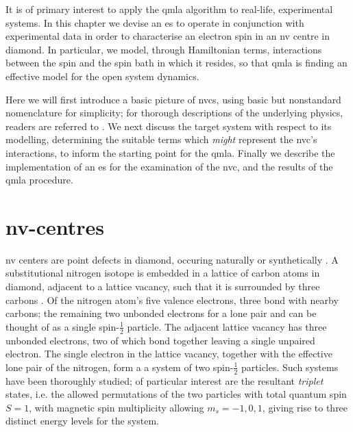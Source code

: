 It is of primary interest to apply the \gls{qmla} algorithm to real-life, experimental systems. 
In this chapter we devise an \gls{es} to operate in conjunction with experimental data 
    in order to characterise an electron spin in an \gls{nv} centre in diamond.
In particular, we model, through Hamiltonian terms, interactions between the spin and 
    the spin bath in which it resides,
    so that \gls{qmla} is finding an effective model for the open system dynamics.
\par

Here we will first introduce a basic picture of \glspl{nvc}, 
    using basic but nonstandard nomenclature for simplicity;
    for thorough descriptions of the underlying physics, readers are referred to \cite{doherty2013nitrogen}.
We next discuss the target system with respect to its modelling, 
    determining the suitable terms which \emph{might} represent the \gls{nvc}'s interactions, 
    to inform the starting point for the \gls{qmla}.
Finally we describe the implementation of an \gls{es} for the examination of the \gls{nvc},
    and the results of the \gls{qmla} procedure. 

\section{\gls{nv}-centres}
\label{sec:nv_centres}

\gls{nv} centers are point defects in diamond, 
    occuring naturally \cite{davies1976optical} or synthetically \cite{meijer2005generation, edmonds2012production}.
A substitutional \gls{nitrogen} isotope is embedded in a lattice of carbon atoms in diamond, 
    adjacent to a lattice vacancy, 
    such that it is surrounded by three \glspl{carbon} \cite{lenef1996electronic}. 
Of the \gls{nitrogen} atom's five valence electrons, three bond with nearby \glspl{carbon};
    the remaining two unbonded electrons for a lone pair and can be thought of as a single spin-$\frac{1}{2}$ particle. 
The adjacent lattice vacancy has three unbonded electrons, 
    two of which bond together leaving a single unpaired electron.
The single electron in the lattice vacancy, together with the effective lone pair of the \gls{nitrogen}, 
    form a a system of two spin-$\frac{1}{2}$ particles.
Such systems have been thoroughly studied; 
    of particular interest are the resultant \emph{triplet} states, 
    i.e. the allowed permutations of the two particles with total quantum spin $S=1$, 
    with magnetic spin multiplicity allowing $m_s = {-1, 0, 1}$, 
    giving rise to three distinct energy levels for the system. 
\par 

